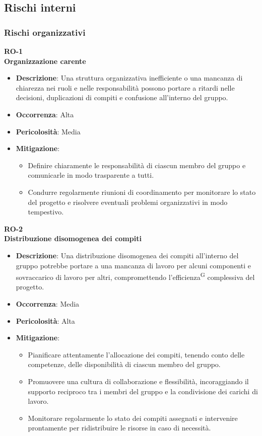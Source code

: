 \documentclass[5pt]{article}
\begin{document}
\subsection{Rischi interni}
\subsubsection{Rischi organizzativi}
\textbf{RO-1}\\
\textbf{Organizzazione carente}
\begin{itemize}
  \item \textbf{Descrizione}: Una struttura organizzativa inefficiente o una mancanza di chiarezza nei ruoli e nelle responsabilità possono portare a ritardi nelle decisioni, duplicazioni di compiti e confusione all'interno del gruppo.
  \item \textbf{Occorrenza}: Alta
  \item \textbf{Pericolosità}: Media
  \item \textbf{Mitigazione}: 
    \begin{itemize}
      \item Definire chiaramente le responsabilità di ciascun membro del gruppo e comunicarle in modo trasparente a tutti.
      \item Condurre regolarmente riunioni di coordinamento per monitorare lo stato del progetto e risolvere eventuali problemi organizzativi in modo tempestivo.
    \end{itemize}
\end{itemize}
\textbf{RO-2}\\
\textbf{Distribuzione disomogenea dei compiti}
\begin{itemize}
  \item \textbf{Descrizione}: Una distribuzione disomogenea dei compiti all'interno del gruppo potrebbe portare a una mancanza di lavoro per alcuni componenti e sovraccarico di lavoro per altri, compromettendo l'efficienza\textsuperscript{G} complessiva del progetto.
  \item \textbf{Occorrenza}: Media
  \item \textbf{Pericolosità}: Alta
  \item \textbf{Mitigazione}: 
    \begin{itemize}
      \item Pianificare attentamente l'allocazione dei compiti, tenendo conto delle competenze, delle disponibilità di ciascun membro del gruppo.
      \item Promuovere una cultura di collaborazione e flessibilità, incoraggiando il supporto reciproco tra i membri del gruppo e la condivisione dei carichi di lavoro.
      \item Monitorare regolarmente lo stato dei compiti assegnati e intervenire prontamente per ridistribuire le risorse in caso di necessità.
    \end{itemize}
\end{itemize}
\end{document}
